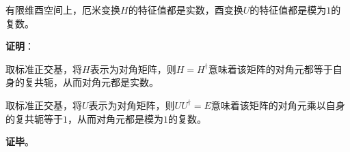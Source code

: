 \begin{theorem}{}
有限维酉空间上，厄米变换$H$的特征值都是实数，酉变换$U$的特征值都是模为$1$的复数。
\end{theorem}

\textbf{证明}：

取标准正交基，将$H$表示为对角矩阵，则$H=H^\dagger$意味着该矩阵的对角元都等于自身的复共轭，从而对角元都是实数。

取标准正交基，将$U$表示为对角矩阵，则$UU^\dagger = E$意味着该矩阵的对角元乘以自身的复共轭等于$1$，从而对角元都是模为$1$的复数。

\textbf{证毕}。



















